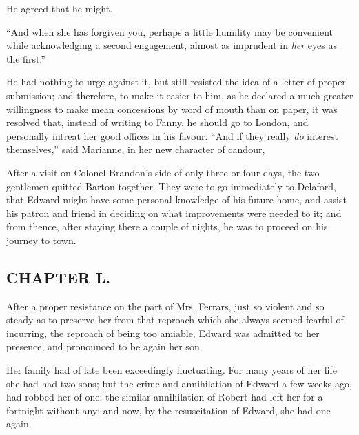 He agreed that he might.

“And when she has forgiven you, perhaps a little humility may be convenient while acknowledging a second engagement, almost as imprudent in {\em her} eyes as the first.”

He had nothing to urge against it, but still resisted the idea of a letter of proper submission; and therefore, to make it easier to him, as he declared a much greater willingness to make mean concessions by word of mouth than on paper, it was resolved that, instead of writing to Fanny, he should go to London, and personally intreat her good offices in his favour. “And if they really {\em do} interest themselves,” said Marianne, in her new character of candour, 

After a visit on Colonel Brandon's side of only three or four days, the two gentlemen quitted Barton together. They were to go immediately to Delaford, that Edward might have some personal knowledge of his future home, and assist his patron and friend in deciding on what improvements were needed to it; and from thence, after staying there a couple of nights, he was to proceed on his journey to town.

\subsection[chapter-l.]{\useURL[url50][][][]\from[url50]CHAPTER L.}

After a proper resistance on the part of Mrs. Ferrars, just so violent and so steady as to preserve her from that reproach which she always seemed fearful of incurring, the reproach of being too amiable, Edward was admitted to her presence, and pronounced to be again her son.

Her family had of late been exceedingly fluctuating. For many years of her life she had had two sons; but the crime and annihilation of Edward a few weeks ago, had robbed her of one; the similar annihilation of Robert had left her for a fortnight without any; and now, by the resuscitation of Edward, she had one again.

